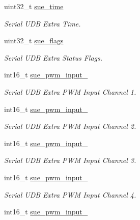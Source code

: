 \begin{DoxyCompactItemize}
\item 
uint32\+\_\+t \hyperlink{struct____mavlink__serial__udb__extra__f2__b__t_a18081c2e58f44c0dccecf248099b4267}{sue\+\_\+time}
\begin{DoxyCompactList}\small\item\em Serial U\+D\+B Extra Time. \end{DoxyCompactList}\item 
uint32\+\_\+t \hyperlink{struct____mavlink__serial__udb__extra__f2__b__t_aa0a8ead193f14f69e19f6bc7cc7d072c}{sue\+\_\+flags}
\begin{DoxyCompactList}\small\item\em Serial U\+D\+B Extra Status Flags. \end{DoxyCompactList}\item 
int16\+\_\+t \hyperlink{struct____mavlink__serial__udb__extra__f2__b__t_a6d3f171748a81b2f4fe4f0ecca051bf2}{sue\+\_\+pwm\+\_\+input\+\_}
\begin{DoxyCompactList}\small\item\em Serial U\+D\+B Extra P\+W\+M Input Channel 1. \end{DoxyCompactList}\item 
int16\+\_\+t \hyperlink{struct____mavlink__serial__udb__extra__f2__b__t_a338557969d88f45e080c092de4cb7fb4}{sue\+\_\+pwm\+\_\+input\+\_}
\begin{DoxyCompactList}\small\item\em Serial U\+D\+B Extra P\+W\+M Input Channel 2. \end{DoxyCompactList}\item 
int16\+\_\+t \hyperlink{struct____mavlink__serial__udb__extra__f2__b__t_a31e5b7758af95efe3b7eb2ac8efd4eb5}{sue\+\_\+pwm\+\_\+input\+\_}
\begin{DoxyCompactList}\small\item\em Serial U\+D\+B Extra P\+W\+M Input Channel 3. \end{DoxyCompactList}\item 
int16\+\_\+t \hyperlink{struct____mavlink__serial__udb__extra__f2__b__t_a57394e3361dde540b22479e30eb489bd}{sue\+\_\+pwm\+\_\+input\+\_}
\begin{DoxyCompactList}\small\item\em Serial U\+D\+B Extra P\+W\+M Input Channel 4. \end{DoxyCompactList}\item 
int16\+\_\+t \hyperlink{struct____mavlink__serial__udb__extra__f2__b__t_ae8b66f6fd2d3e0bf037bbad551895b00}{sue\+\_\+pwm\+\_\+input\+\_}

\end{DoxyCompactItemize}
